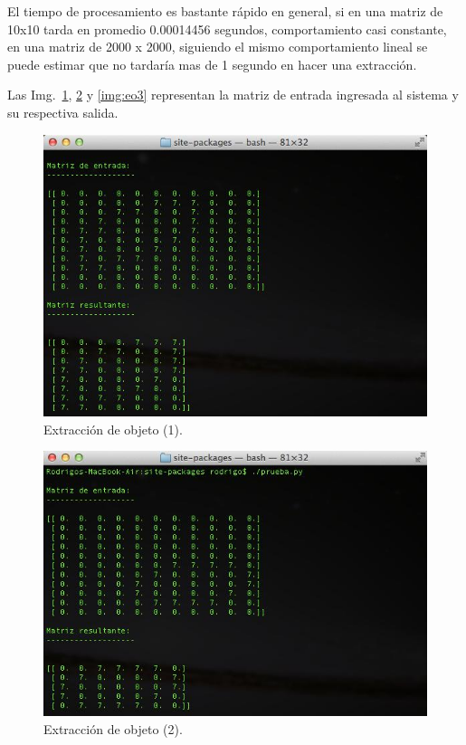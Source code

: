 El tiempo de procesamiento es bastante rápido en general, si en una matriz de 10x10 tarda en promedio 0.00014456 segundos, comportamiento casi constante, en una matriz de 2000 x 2000, siguiendo el mismo comportamiento lineal se puede estimar que no tardaría mas de 1 segundo en hacer una extracción.

Las Img.~\ref{img:eo1}, \ref{img:eo2} y \ref{img:eo3} representan la matriz de entrada ingresada al sistema y su respectiva salida.

\begin{figure}[ht!]
	\centering
	\includegraphics[scale=.5]{img/eo1}
	\caption{Extracción de objeto (1).}\label{img:eo1}
\end{figure}

\begin{figure}[ht!]
	\centering
	\includegraphics[scale=.5]{img/eo2}
	\caption{Extracción de objeto (2).}\label{img:eo2}
\end{figure}

